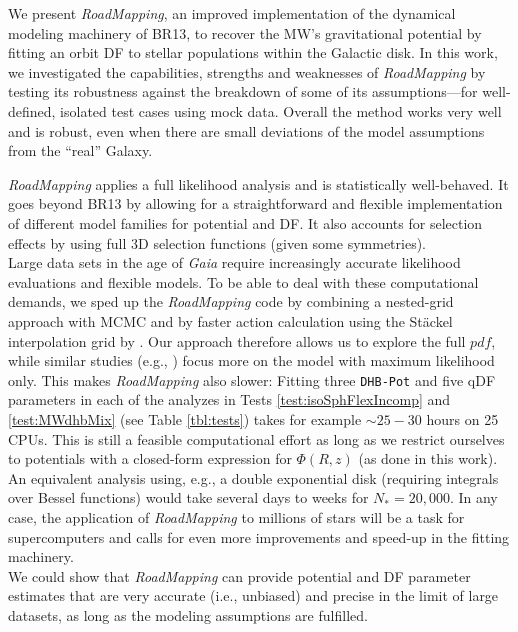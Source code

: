 \documentclass[iop,revtex4,numberedappendix,appendixfloats]{emulateapj}
\newcommand{\pdf}{\ensuremath{pdf}}
\newcommand{\RM}{{\sl RoadMapping}}
\begin{document}
We present \RM{}, an improved implementation of the dynamical modeling machinery of BR13, to recover the MW's gravitational potential by fitting an orbit DF to stellar populations within the Galactic disk. In this work, we investigated the capabilities, strengths and weaknesses of \RM{} by testing its robustness against the breakdown of some of its assumptions---for well-defined, isolated test cases using mock data. Overall the method works very well and is robust, even when there are small deviations of the model assumptions from the ``real'' Galaxy.

\RM{} applies a full likelihood analysis and is statistically well-behaved. It goes beyond BR13 by allowing for a straightforward and flexible implementation of different model families for potential and DF. It also accounts for selection effects by using full 3D selection functions (given some symmetries).\\

 Large data sets in the age of \emph{Gaia} require increasingly accurate likelihood evaluations and flexible models. To be able to deal with these computational demands, we sped up the \RM{} code by combining a nested-grid approach with MCMC and by faster action calculation using the St\"{a}ckel \citep{2012MNRAS.426.1324B} interpolation grid by \citet{2015ApJS..216...29B}. Our approach therefore allows us to explore the full \pdf{}, while similar studies (e.g., \citealt{2014MNRAS.445.3133P,2015MNRAS.449.3479S,2016MNRAS.tmp..817D}) focus more on the model with maximum likelihood only. This makes \RM{} also slower: Fitting three \texttt{DHB-Pot} and five qDF parameters in each of the analyzes in Tests \ref{test:isoSphFlexIncomp} and \ref{test:MWdhbMix} (see Table \ref{tbl:tests}) takes for example $\sim 25-30$ hours on 25 CPUs. This is still a feasible computational effort as long as we restrict ourselves to potentials with a closed-form expression for $\Phi(R,z)$ (as done in this work). An equivalent analysis using, e.g., a double exponential disk (requiring integrals over Bessel functions) would take several days to weeks for $N_*=20,000$. In any case, the application of \RM{} to millions of stars will be a task for supercomputers and calls for even more improvements and speed-up in the fitting machinery.\\

 We could show that \RM{} can provide potential and DF parameter estimates that are very accurate (i.e., unbiased) and precise in the limit of large datasets, as long as the modeling assumptions are fulfilled.
\end{document}
